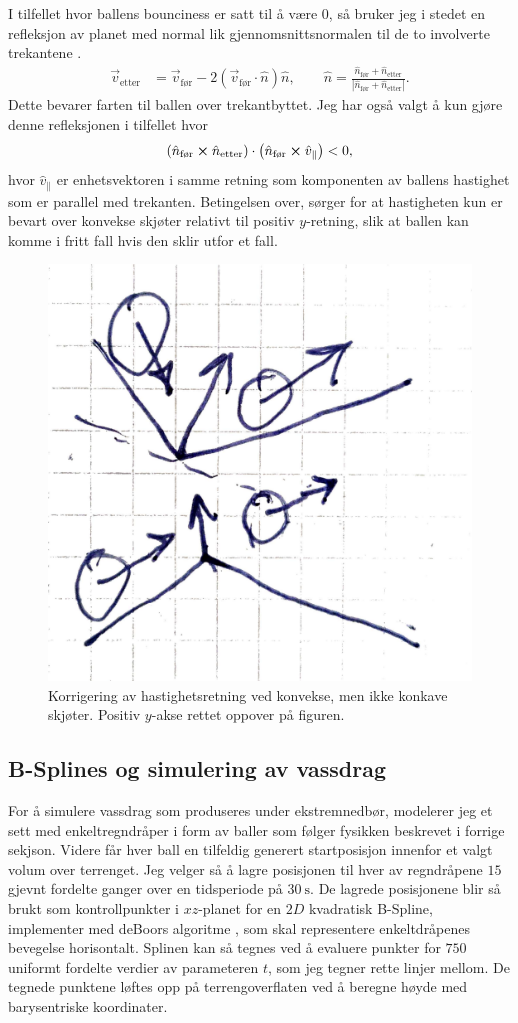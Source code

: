 \documentclass[norsk, doc, 11pt, a4paper]{apa7}  %
\begin{document}
I tilfellet hvor ballens bounciness er satt til å være \(0\), så bruker jeg i stedet en refleksjon av planet med normal lik gjennomsnittsnormalen til de to involverte trekantene \parencite[ss.120-124]{nylundMAT301MatematikkIII2023}.
\begin{align*}
	\vec{v}_{\text{etter}} &= \vec{v}_{\text{før}} - 2\left(\vec{v}_{\text{før}}\cdot\hat{n}\right)\hat{n},
	\qquad
	\hat{n} = \frac{\hat{n}_{\text{før}}+\hat{n}_{\text{etter}}}{|\hat{n}_{\text{før}}+\hat{n}_{\text{etter}}|}.
\end{align*}
Dette bevarer farten til ballen over trekantbyttet. Jeg har også valgt å kun gjøre denne refleksjonen i tilfellet hvor
\begin{align*}
	\left(\hat{n}_{\text{før}}\cross \hat{n}_{\text{etter}}\right)\cdot\left(\hat{n}_{\text{før}}\cross \hat{v}_{\parallel}\right) < 0,
\end{align*}
hvor \(\hat{v}_{\parallel}\) er enhetsvektoren i samme retning som komponenten av ballens hastighet som er parallel med trekanten.
Betingelsen over, sørger for at hastigheten kun er bevart over konvekse skjøter relativt til positiv \(y\)-retning, slik at ballen kan komme i fritt fall hvis den sklir utfor et fall.
\begin{figure}[H]
	\centering
	\includegraphics[width=.25\textwidth]{figs/refleksjon.pdf}
	\caption{Korrigering av hastighetsretning ved konvekse, men ikke konkave skjøter. Positiv \(y\)-akse rettet oppover på figuren.}
\end{figure}

\subsection{B-Splines og simulering av vassdrag}
For å simulere vassdrag som produseres under ekstremnedbør, modelerer jeg et sett med enkeltregndråper i form av baller som følger fysikken beskrevet i forrige sekjson. Videre får hver ball en tilfeldig generert startposisjon innenfor et valgt volum over terrenget. Jeg velger så å lagre posisjonen til hver av regndråpene \(15\) gjevnt fordelte ganger over en tidsperiode på \(\SI{30}{\second}\). De lagrede posisjonene blir så brukt som kontrollpunkter i \(xz\)-planet for en \(2D\) kvadratisk B-Spline, implementer med deBoors algoritme \parencite[ss.98-102]{nylundMAT301MatematikkIII2023}, som skal representere enkeltdråpenes bevegelse horisontalt. Splinen kan så tegnes ved å evaluere punkter for \(750\) uniformt fordelte verdier av parameteren \(t\), som jeg tegner rette linjer mellom. De tegnede punktene løftes opp på terrengoverflaten ved å beregne høyde med barysentriske koordinater.
\end{document}
